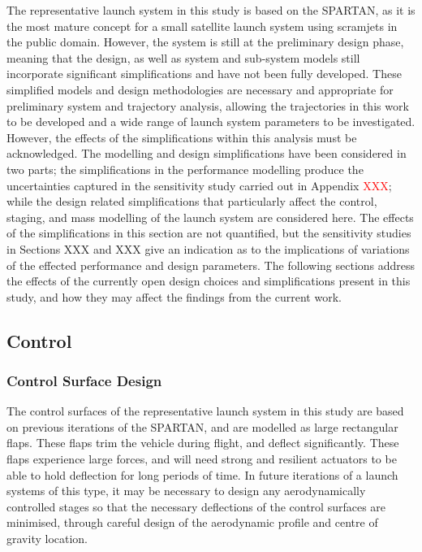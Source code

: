 The representative launch system in this study is based on the SPARTAN\cite{Preller2017b}, as it is the most mature concept for a small satellite launch system using scramjets in the public domain. However, the system is still at the preliminary design phase, meaning that the design, as well as system and sub-system models still incorporate significant simplifications and have not been fully developed. These simplified models and design methodologies are necessary and appropriate for preliminary system and trajectory analysis, allowing the trajectories in this work to be developed and a wide range of launch system parameters to be investigated. However, the effects of the simplifications within this analysis must be acknowledged.
The modelling and design simplifications have been considered in two parts; the simplifications in the performance modelling produce the uncertainties captured in the sensitivity study carried out in Appendix \textcolor{red}{XXX}; while the design related simplifications that particularly affect the control, staging, and mass modelling of the launch system are considered here. The effects of the simplifications in this section are not quantified, but the sensitivity studies in Sections XXX and XXX give an indication as to the implications of variations of the effected performance and design parameters.
The following sections address the effects of the currently open design choices and simplifications present in this study, and how they may affect the findings from the current work. 

\subsection{Control}


\subsubsection{Control Surface Design}


The control surfaces of the representative launch system in this study are based on previous iterations of the SPARTAN\cite{Preller2017b}, and are modelled as large rectangular flaps. These flaps trim the vehicle during flight, and deflect significantly. These flaps experience large forces, and will need strong and resilient actuators to be able to hold deflection for long periods of time. In future iterations of a launch systems of this type, it may be necessary to design any aerodynamically controlled stages so that the necessary deflections of the control surfaces are minimised, through careful design of the aerodynamic profile and centre of gravity location.

